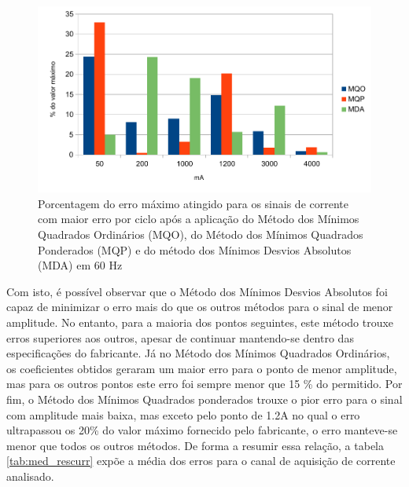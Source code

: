 \begin{figure}
    \caption{Porcentagem do erro máximo atingido para os sinais de corrente com maior erro por ciclo após a aplicação do Método dos Mínimos Quadrados Ordinários (MQO), do Método dos Mínimos Quadrados Ponderados (MQP) e do método dos Mínimos Desvios Absolutos (MDA) em 60 Hz}
    \label{fig:res_curr}
    \centering
    \includegraphics[width=0.9\linewidth]{pictures/max_err_IA_aftercalib60Hz}
\end{figure}

Com isto, é possível observar que o Método dos Mínimos Desvios Absolutos foi capaz de minimizar o erro mais do que os outros métodos para o sinal de menor amplitude. No entanto, para a maioria dos pontos seguintes, este método trouxe erros superiores aos outros, apesar de continuar mantendo-se dentro das especificações do fabricante. Já no Método dos Mínimos Quadrados Ordinários, os coeficientes obtidos geraram um maior erro para o ponto de menor amplitude, mas para os outros pontos este erro foi sempre menor que 15 \% do permitido. Por fim, o Método dos Mínimos Quadrados ponderados trouxe o pior erro para o sinal com amplitude mais baixa, mas exceto pelo ponto de 1.2A no qual o erro ultrapassou os 20\% do valor máximo fornecido pelo fabricante, o erro manteve-se menor que todos os outros métodos. De forma a resumir essa relação, a tabela \ref{tab:med_rescurr} expõe a média dos erros para o canal de aquisição de corrente analisado.

\begin{table}[htb]
\end{table}

